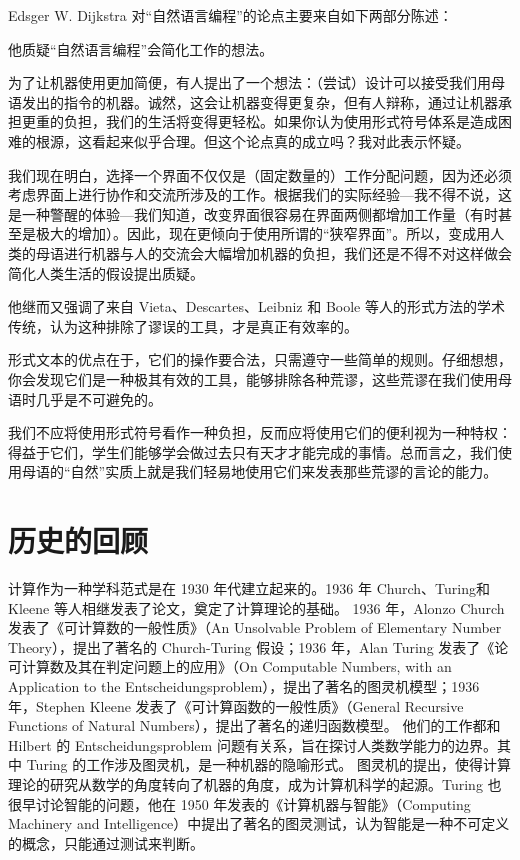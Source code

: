 \documentclass[a4paper,12pt]{article}
\begin{document}
Edsger W. Dijkstra 对“自然语言编程”的论点主要来自如下两部分陈述：

他质疑“自然语言编程”会简化工作的想法。

\begin{displayquote}
为了让机器使用更加简便，有人提出了一个想法：（尝试）设计可以接受我们用母语发出的指令的机器。诚然，这会让机器变得更复杂，但有人辩称，通过让机器承担更重的负担，我们的生活将变得更轻松。如果你认为使用形式符号体系是造成困难的根源，这看起来似乎合理。但这个论点真的成立吗？我对此表示怀疑。

我们现在明白，选择一个界面不仅仅是（固定数量的）工作分配问题，因为还必须考虑界面上进行协作和交流所涉及的工作。根据我们的实际经验—我不得不说，这是一种警醒的体验—我们知道，改变界面很容易在界面两侧都增加工作量（有时甚至是极大的增加）。因此，现在更倾向于使用所谓的“狭窄界面”。所以，变成用人类的母语进行机器与人的交流会大幅增加机器的负担，我们还是不得不对这样做会简化人类生活的假设提出质疑。
\end{displayquote}

他继而又强调了来自 Vieta、Descartes、Leibniz 和 Boole 等人的形式方法的学术传统，认为这种排除了谬误的工具，才是真正有效率的。

\begin{displayquote}
形式文本的优点在于，它们的操作要合法，只需遵守一些简单的规则。仔细想想，你会发现它们是一种极其有效的工具，能够排除各种荒谬，这些荒谬在我们使用母语时几乎是不可避免的。

我们不应将使用形式符号看作一种负担，反而应将使用它们的便利视为一种特权：得益于它们，学生们能够学会做过去只有天才才能完成的事情。总而言之，我们使用母语的“自然”实质上就是我们轻易地使用它们来发表那些荒谬的言论的能力。
\end{displayquote}

\section{历史的回顾}

计算作为一种学科范式是在 1930 年代建立起来的。1936 年 Church、Turing和 Kleene 等人相继发表了论文，奠定了计算理论的基础。
1936 年，Alonzo Church 发表了《可计算数的一般性质》（An Unsolvable Problem of Elementary Number Theory），提出了著名的 Church-Turing 假设；1936 年，Alan Turing 发表了《论可计算数及其在判定问题上的应用》（On Computable Numbers, with an Application to the Entscheidungsproblem），提出了著名的图灵机模型；1936 年，Stephen Kleene 发表了《可计算函数的一般性质》（General Recursive Functions of Natural Numbers），提出了著名的递归函数模型。
他们的工作都和 Hilbert 的 Entscheidungsproblem 问题有关系，旨在探讨人类数学能力的边界。其中 Turing 的工作涉及图灵机，是一种机器的隐喻形式。
图灵机的提出，使得计算理论的研究从数学的角度转向了机器的角度，成为计算机科学的起源。Turing 也很早讨论智能的问题，他在 1950 年发表的《计算机器与智能》（Computing Machinery and Intelligence）中提出了著名的图灵测试，认为智能是一种不可定义的概念，只能通过测试来判断。
\end{document}
